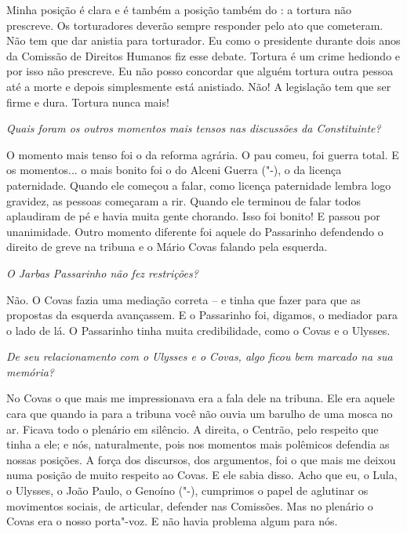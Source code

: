 Minha posição é clara e é também a posição também do :
a tortura não prescreve. Os torturadores deverão sempre responder pelo
ato que cometeram. Não tem que dar anistia para torturador. Eu como o
presidente durante dois anos da Comissão de Direitos Humanos fiz esse
debate. Tortura é um crime hediondo e por isso não prescreve. Eu não
posso concordar que alguém tortura outra pessoa até a morte e depois
simplesmente está anistiado. Não! A legislação tem que ser firme e dura.
Tortura nunca mais!

\medskip

\noindent\emph{Quais foram os outros momentos mais tensos nas discussões da
Constituinte?}

O momento mais tenso foi o da reforma agrária. O pau
comeu, foi guerra total. E os momentos... o mais bonito foi o do Alceni
Guerra ("-), o da licença paternidade. Quando ele começou a falar,
como licença paternidade lembra logo gravidez, as pessoas começaram a
rir. Quando ele terminou de falar todos aplaudiram de pé e havia muita
gente chorando. Isso foi bonito! E passou por unanimidade. Outro momento
diferente foi aquele do Passarinho defendendo o direito de greve na
tribuna e o Mário Covas falando pela esquerda.

\medskip

\noindent\emph{O Jarbas Passarinho não fez restrições?}

Não. O Covas fazia uma mediação correta -- e tinha que
fazer para que as propostas da esquerda avançassem. E o Passarinho foi,
digamos, o mediador para o lado de lá. O Passarinho tinha muita
credibilidade, como o Covas e o Ulysses.

\medskip

\noindent\emph{De seu relacionamento com o Ulysses e o Covas, algo ficou bem
marcado na sua memória?}

No Covas o que mais me impressionava era a fala dele na
tribuna. Ele era aquele cara que quando ia para a tribuna você não ouvia
um barulho de uma mosca no ar. Ficava todo o plenário em silêncio. A
direita, o Centrão, pelo respeito que tinha a ele; e nós, naturalmente,
pois nos momentos mais polêmicos defendia as nossas posições. A força
dos discursos, dos argumentos, foi o que mais me deixou numa posição de
muito respeito ao Covas. E ele sabia disso. Acho que eu, o Lula, o
Ulysses, o João Paulo, o Genoíno ("-), cumprimos o papel de aglutinar
os movimentos sociais, de articular, defender nas Comissões. Mas no
plenário o Covas era o nosso porta"-voz. E não havia problema algum para
nós.

